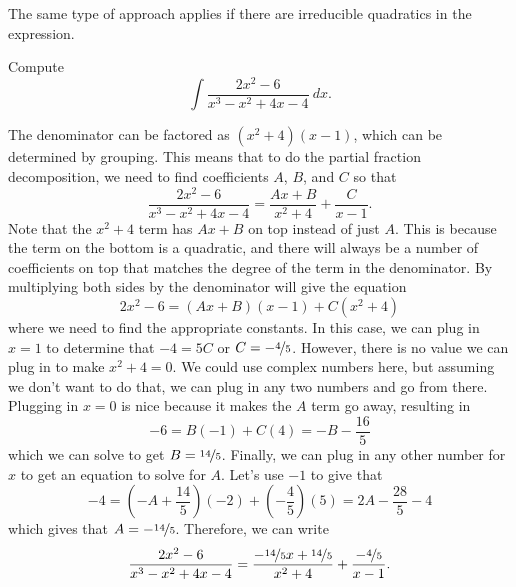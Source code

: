 \documentclass{ximera}
\begin{document}
The same type of approach applies if there are irreducible quadratics in the expression.

\begin{example}
    Compute
    \begin{equation*}
        \int \frac{2x^2 - 6}{x^3 - x^2 + 4x - 4}\ dx.
    \end{equation*}
\end{example}

\begin{exampleSol}
    The denominator can be factored as $(x^2 + 4)(x-1)$, which can be determined by grouping. This means that to do the partial fraction decomposition, we need to find coefficients $A$, $B$, and $C$ so that
    \begin{equation*}
        \frac{2x^2 - 6}{x^3 - x^2 + 4x - 4} = \frac{Ax + B}{x^2 + 4} + \frac{C}{x-1}.
    \end{equation*}
    Note that the $x^2 + 4$ term has $Ax + B$ on top instead of just $A$. This is because the term on the bottom is a quadratic, and there will always be a number of coefficients on top that matches the degree of the term in the denominator. By multiplying both sides by the denominator will give the equation
    \begin{equation*}
        2x^2 - 6 = (Ax + B)(x-1) + C(x^2 + 4)
    \end{equation*}
    where we need to find the appropriate constants. In this case, we can plug in $x=1$ to determine that $-4 = 5C$ or $C = -\nicefrac{4}{5}$. However, there is no value we can plug in to make $x^2 + 4 = 0$. We could use complex numbers here, but assuming we don't want to do that, we can plug in any two numbers and go from there. Plugging in $x=0$ is nice because it makes the $A$ term go away, resulting in
    \begin{equation*}
        -6 = B(-1) + C(4) = -B - \frac{16}{5}
    \end{equation*}
    which we can solve to get $B = \nicefrac{14}{5}$. Finally, we can plug in any other number for $x$ to get an equation to solve for $A$. Let's use $-1$ to give that
    \begin{equation*}
        -4 = \left(-A + \frac{14}{5}\right)(-2) + \left(-\frac{4}{5}\right)(5) = 2A - \frac{28}{5} - 4
    \end{equation*}
    which gives that $A = -\nicefrac{14}{5}$. Therefore, we can write 
    \begin{equation*}
        \frac{2x^2 - 6}{x^3 - x^2 + 4x - 4} = \frac{-\nicefrac{14}{5}x + \nicefrac{14}{5}}{x^2 + 4} + \frac{-\nicefrac{4}{5}}{x-1}.

\end{equation*}
\end{exampleSol}
\end{document}
